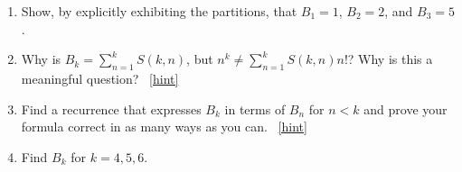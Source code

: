 \documentclass{book}
\begin{document}
\setcounter{project}{206}
\addtocounter{project}{-1}
\begin{activity}[]\label{BellNumberIntro}
\leavevmode%
\begin{enumerate}[font=\bfseries,label=(\alph*),ref=\alph*]
\item\label{task-216} \hypertarget{p-1160}{}%
Show, by explicitly exhibiting the partitions, that \(B_1 = 1\), \(B_2 = 2\), and \(B_3 = 5\).%
\item\label{task-217} \hypertarget{p-1162}{}%
Why is \(B_k = \sum_{n=1}^{k} S(k,n)\), but \(n^k \ne \sum_{n=1}^k S(k,n)n!\)?  Why is this a meaningful question?%
~\hfill{\tiny\hyperlink{a-206.b}{[hint]}\hypertarget{q-206.b}{}}\item\label{task-218} \hypertarget{p-1164}{}%
Find a recurrence that expresses \(B_k\) in terms of \(B_n\) for \(n\lt  k\) and prove your formula correct in as many ways as you can.%
~\hfill{\tiny\hyperlink{a-206.c}{[hint]}\hypertarget{q-206.c}{}}\item\label{task-219} \hypertarget{p-1168}{}%
Find \(B_k\) for \(k=4,5,6\).%
\end{enumerate}
\end{activity}
\end{document}
